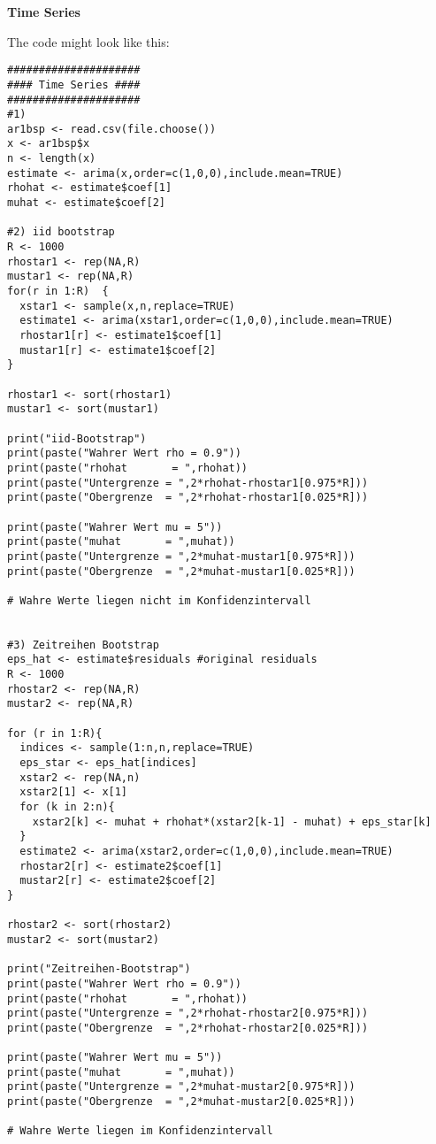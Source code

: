 \documentclass{article}
\begin{document}
\begin{solution}
\textbf{Time Series}

The code might look like this:
\begin{verbatim}
#####################
#### Time Series ####
#####################
#1)
ar1bsp <- read.csv(file.choose())
x <- ar1bsp$x
n <- length(x)
estimate <- arima(x,order=c(1,0,0),include.mean=TRUE)
rhohat <- estimate$coef[1]
muhat <- estimate$coef[2]

#2) iid bootstrap
R <- 1000
rhostar1 <- rep(NA,R)
mustar1 <- rep(NA,R)
for(r in 1:R)  {
  xstar1 <- sample(x,n,replace=TRUE)
  estimate1 <- arima(xstar1,order=c(1,0,0),include.mean=TRUE)
  rhostar1[r] <- estimate1$coef[1]
  mustar1[r] <- estimate1$coef[2]
}

rhostar1 <- sort(rhostar1)
mustar1 <- sort(mustar1)

print("iid-Bootstrap")
print(paste("Wahrer Wert rho = 0.9"))
print(paste("rhohat       = ",rhohat))
print(paste("Untergrenze = ",2*rhohat-rhostar1[0.975*R]))
print(paste("Obergrenze  = ",2*rhohat-rhostar1[0.025*R]))

print(paste("Wahrer Wert mu = 5"))
print(paste("muhat       = ",muhat))
print(paste("Untergrenze = ",2*muhat-mustar1[0.975*R]))
print(paste("Obergrenze  = ",2*muhat-mustar1[0.025*R]))

# Wahre Werte liegen nicht im Konfidenzintervall


#3) Zeitreihen Bootstrap
eps_hat <- estimate$residuals #original residuals
R <- 1000
rhostar2 <- rep(NA,R)
mustar2 <- rep(NA,R)

for (r in 1:R){
  indices <- sample(1:n,n,replace=TRUE)
  eps_star <- eps_hat[indices]
  xstar2 <- rep(NA,n)
  xstar2[1] <- x[1]
  for (k in 2:n){
    xstar2[k] <- muhat + rhohat*(xstar2[k-1] - muhat) + eps_star[k]
  }
  estimate2 <- arima(xstar2,order=c(1,0,0),include.mean=TRUE)
  rhostar2[r] <- estimate2$coef[1]
  mustar2[r] <- estimate2$coef[2]
}

rhostar2 <- sort(rhostar2)
mustar2 <- sort(mustar2)

print("Zeitreihen-Bootstrap")
print(paste("Wahrer Wert rho = 0.9"))
print(paste("rhohat       = ",rhohat))
print(paste("Untergrenze = ",2*rhohat-rhostar2[0.975*R]))
print(paste("Obergrenze  = ",2*rhohat-rhostar2[0.025*R]))

print(paste("Wahrer Wert mu = 5"))
print(paste("muhat       = ",muhat))
print(paste("Untergrenze = ",2*muhat-mustar2[0.975*R]))
print(paste("Obergrenze  = ",2*muhat-mustar2[0.025*R]))

# Wahre Werte liegen im Konfidenzintervall
\end{verbatim}
\end{solution}
\end{document}

